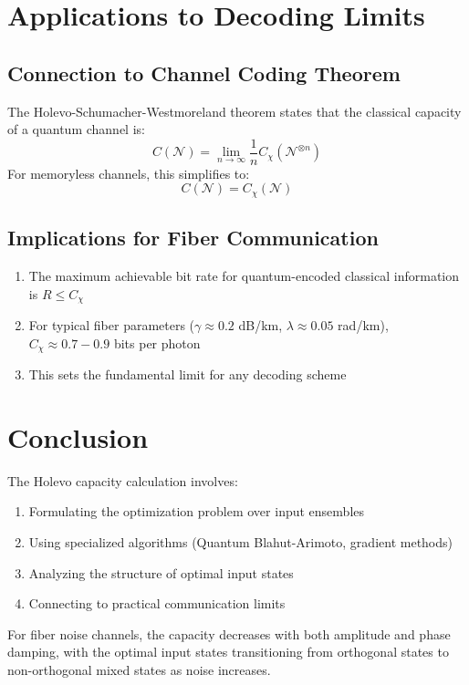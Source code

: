 \documentclass[12pt]{article}
\begin{document}
\section{Applications to Decoding Limits}

\subsection{Connection to Channel Coding Theorem}
The Holevo-Schumacher-Westmoreland theorem states that the classical capacity of a quantum channel is:
\[
C(\mathcal{N}) = \lim_{n \to \infty} \frac{1}{n} C_{\chi}(\mathcal{N}^{\otimes n})
\]
For memoryless channels, this simplifies to:
\[
C(\mathcal{N}) = C_{\chi}(\mathcal{N})
\]

\subsection{Implications for Fiber Communication}
\begin{enumerate}
    \item The maximum achievable bit rate for quantum-encoded classical information is $R \leq C_{\chi}$
    \item For typical fiber parameters ($\gamma \approx 0.2$ dB/km, $\lambda \approx 0.05$ rad/km), $C_{\chi} \approx 0.7-0.9$ bits per photon
    \item This sets the fundamental limit for any decoding scheme
\end{enumerate}

\section{Conclusion}

The Holevo capacity calculation involves:
\begin{enumerate}
    \item Formulating the optimization problem over input ensembles
    \item Using specialized algorithms (Quantum Blahut-Arimoto, gradient methods)
    \item Analyzing the structure of optimal input states
    \item Connecting to practical communication limits
\end{enumerate}

For fiber noise channels, the capacity decreases with both amplitude and phase damping, with the optimal input states transitioning from orthogonal states to non-orthogonal mixed states as noise increases.
\end{document}
